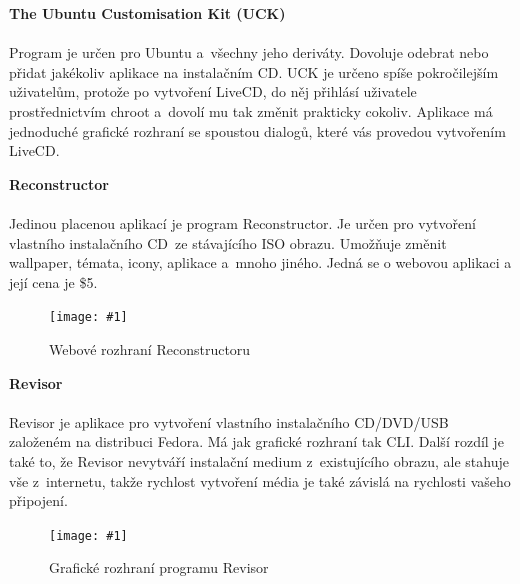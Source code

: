 \documentclass[a4paper,12pt]{article}
\newcommand{\nadpis}[1]{%
	\vspace{4 mm}
	\textbf{#1}\\
	\vspace{4 mm}
	}
\newcommand{\obr}[3]{%
	\begin{figure}[h]
	\center\texttt{[image: \#1]}
	\caption{#3}
	\end{figure}
	}
\begin{document}
\nadpis{The Ubuntu Customisation Kit (UCK)}\\ \label{sec:UCK}
Program je určen pro Ubuntu a~všechny jeho deriváty. Dovoluje odebrat nebo přidat jakékoliv aplikace na instalačním CD. UCK je určeno spíše pokročilejším uživatelům, protože po vytvoření LiveCD, do něj přihlásí uživatele prostřednictvím chroot a~dovolí mu tak změnit prakticky cokoliv. Aplikace má jednoduché grafické rozhraní se spoustou dialogů, které vás provedou vytvořením LiveCD.\cite{Linux_Build}


\nadpis{Reconstructor}\\
Jedinou placenou aplikací je program Reconstructor. Je určen pro vytvoření vlastního instalačního CD ze stávajícího ISO obrazu. Umožňuje změnit wallpaper, témata, icony, aplikace a~mnoho jiného.
Jedná se o webovou aplikaci a její cena je \$5.\cite{Linux_Build}
\begin{center}
\obr{./img/screens/reconstructor.jpg}{0.5}{Webové rozhraní Reconstructoru}
\end{center}


\nadpis{Revisor}\\
Revisor je aplikace pro vytvoření vlastního instalačního CD/DVD/USB založeném na distribuci Fedora. Má jak grafické rozhraní tak CLI. Další rozdíl je také to, že Revisor nevytváří instalační medium z~existujícího obrazu, ale stahuje vše z~internetu, takže rychlost vytvoření média je také závislá na rychlosti vašeho připojení.\cite{Linux_Build}
\begin{center}
\obr{./img/screens/revisor.jpg}{0.7}{Grafické rozhraní programu Revisor}
\end{center}
\end{document}
